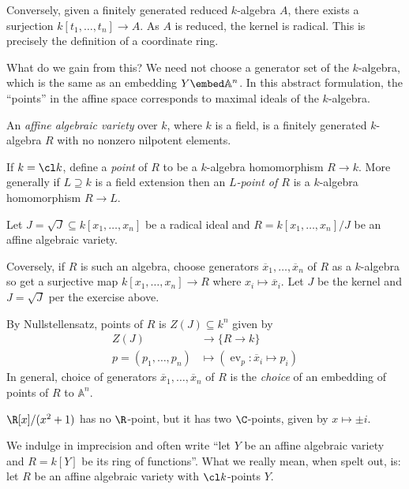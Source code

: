 \documentclass[a4paper]{article}
\renewcommand{\A}{\mathbb{A}}
\DeclareMathOperator{\ev}{ev}
\begin{document}
Conversely, given a finitely generated reduced \(k\)-algebra \(A\), there exists a surjection \(k[t_1, \dots, t_n] \to A\). As \(A\) is reduced, the kernel is radical. This is precisely the definition of a coordinate ring.

What do we gain from this? We need not choose a generator set of the \(k\)-algebra, which is the same as an embedding \(Y \embed \A^n\). In this abstract formulation, the ``points'' in the affine space corresponds to maximal ideals of the \(k\)-algebra.

\begin{definition}
  An \emph{affine algebraic variety} over \(k\), where \(k\) is a field, is a finitely generated \(k\)-algebra \(R\) with no nonzero nilpotent elements.

  If \(k = \cl k\), define a \emph{point} of \(R\) to be a \(k\)-algebra homomorphism \(R \to k\). More generally if \(L \supseteq k\) is a field extension then an \emph{\(L\)-point of \(R\)} is a \(k\)-algebra homomorphism \(R \to L\).
\end{definition}

\begin{eg}
  Let \(J = \sqrt J \subseteq k[x_1, \dots, x_n]\) be a radical ideal and \(R = k[x_1, \dots, x_n]/J\) be an affine algebraic variety.
  
  Coversely, if \(R\) is such an algebra, choose generators \(\overline x_1, \dots, \overline x_n\) of \(R\) as a \(k\)-algebra so get a surjective map \(k[x_1, \dots, x_n] \to R\) where \(x_i \mapsto \overline x_i\). Let \(J\) be the kernel and \(J = \sqrt J\) per the exercise above.

  By Nullstellensatz, points of \(R\) is \(Z(J) \subseteq k^n\) given by
  \begin{align*}
    Z(J) &\to \{R \to k\} \\
    p = (p_1, \dots, p_n) &\mapsto (\ev_p: \overline x_i \mapsto p_i)
  \end{align*}
  In general, choice of generators \(\overline x_1, \dots, \overline x_n\) of \(R\) is the \emph{choice} of an embedding of points of \(R\) to \(\A^n\).
\end{eg}

\begin{eg}
  \(\R[x]/(x^2 + 1)\) has no \(\R\)-point, but it has two \(\C\)-points, given by \(x \mapsto \pm i\).
\end{eg}

We indulge in imprecision and often write ``let \(Y\) be an affine algebraic variety and \(R = k[Y]\) be its ring of functions''. What we really mean, when spelt out, is: let \(R\) be an affine algebraic variety with \(\cl k\)-points \(Y\).
\end{document}
